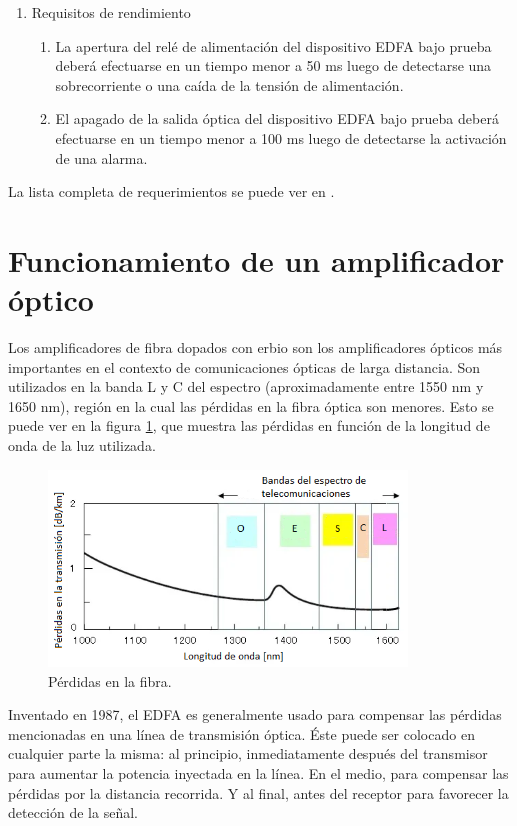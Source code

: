 \begin{enumerate}
\item Requisitos de rendimiento
	\begin{enumerate}
	\item La apertura del relé de alimentación del dispositivo EDFA 		bajo prueba deberá efectuarse en un tiempo menor a 50 ms luego de 		detectarse una sobrecorriente o una caída de la tensión de 				alimentación.
	\item El apagado de la salida óptica del dispositivo EDFA bajo 			prueba deberá efectuarse en un tiempo menor a 100 ms luego de 			detectarse la activación de una alarma.
	\end{enumerate}
	
\end{enumerate}

La lista completa de requerimientos se puede ver en \citep{DOC_REQ}.

\section{Funcionamiento de un amplificador óptico}
\label{sec:funcAmp}

Los amplificadores de fibra dopados con erbio son los amplificadores ópticos más importantes en el contexto de comunicaciones ópticas de larga distancia. Son utilizados en la banda L y C del espectro (aproximadamente entre 1550 nm y 1650 nm), región en la cual las pérdidas en la fibra óptica son menores. Esto se puede ver en la figura \ref{fig:espectro}, que muestra las pérdidas en función de la longitud de onda de la luz utilizada.

\begin{figure}[H]
\centering
\includegraphics[width=0.85\textwidth]{./Figures/espectro.png}
\caption{Pérdidas en la fibra.}
\label{fig:espectro}
\end{figure}

Inventado en 1987, el EDFA es generalmente usado para compensar las pérdidas mencionadas en una línea de transmisión óptica. Éste puede ser colocado en cualquier parte la misma: al principio, inmediatamente después del transmisor para aumentar la potencia inyectada en la línea. En el medio, para compensar las pérdidas por la distancia recorrida. Y al final, antes del receptor para favorecer la detección de la señal.

